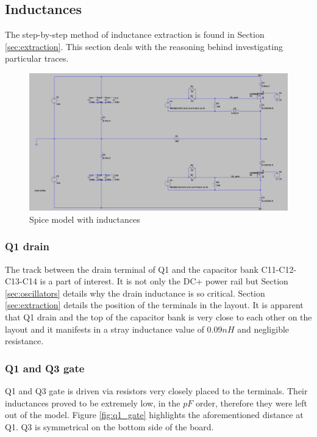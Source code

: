 \subsection{Inductances}
\label{sec:inductances}

The step-by-step method of inductance extraction is found in Section \ref{sec:extraction}. This section deals with the reasoning behind investigating particular traces.

\begin{figure}[H]
	\centering
	\includegraphics[width=\textwidth]{pictures/implementation/ind/spice_ind_1.PNG}
	\caption{Spice model with inductances}
	\label{fig:spice_ind}
\end{figure}

\subsubsection{Q1 drain}
\label{sec:Q1_drain}

The track between the drain terminal of Q1 and the capacitor bank C11-C12-C13-C14 is a part of interest. It is not only the DC+ power rail but Section \ref{sec:oscillators} details why the drain inductance is so critical. Section \ref{sec:extraction} details the position of the terminals in the layout. It is apparent that Q1 drain and the top of the capacitor bank is very close to each other on the layout and it manifests in a stray inductance value of $0.09 nH$ and negligible resistance.

\subsubsection{Q1 and Q3 gate}
\label{sec:q1_q3_gate}

Q1 and Q3 gate is driven via resistors very closely placed to the terminals. Their inductances proved to be extremely low, in the $pF$ order, therefore they were left out of the model. Figure \ref{fig:q1_gate} highlights the aforementioned distance at Q1. Q3 is symmetrical on the bottom side of the board.

